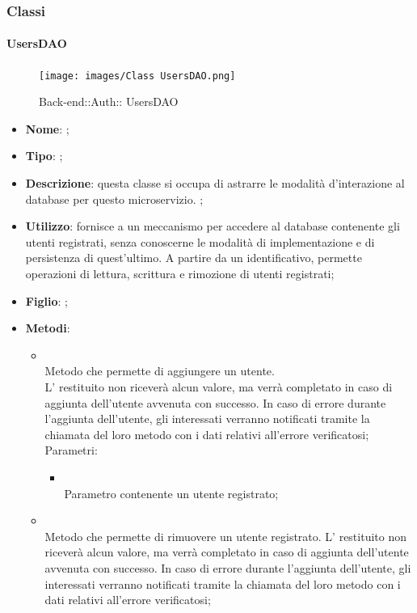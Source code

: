 \subsubsection{Classi}
\hypertarget{ UsersDAO_label}{\paragraph{ UsersDAO}}
\begin{figure}[h]
	\centering
	\texttt{[image: images/Class UsersDAO.png]}
	\caption{Back-end::Auth:: UsersDAO}
\end{figure}
\begin{itemize}
	\item \textbf{Nome}: ;
	\item \textbf{Tipo}: ;
	\item \textbf{Descrizione}: questa classe si occupa di astrarre le modalità d'interazione al database per questo microservizio. ;
	\item \textbf{Utilizzo}: fornisce a  un meccanismo per accedere al database contenente gli utenti registrati, senza conoscerne le modalità di implementazione e di persistenza di quest'ultimo.
A partire da un identificativo, permette operazioni di lettura, scrittura e rimozione di utenti registrati;
	\item \textbf{Figlio}: ;
	\item \textbf{Metodi}:
	\begin{itemize}
		\item[]  \\
		Metodo che permette di aggiungere un utente. \\
L' restituito non riceverà alcun valore, ma verrà completato in caso di aggiunta dell'utente avvenuta con successo. In caso di errore durante l'aggiunta dell'utente, gli  interessati verranno notificati tramite la chiamata del loro metodo  con i dati relativi all'errore verificatosi;\\
		Parametri:
		\begin{itemize}
			\item {} \\
			Parametro contenente un utente registrato;
		\end{itemize}
		\item[]  \\
		Metodo che permette di rimuovere un utente registrato. L' restituito non riceverà alcun valore, ma verrà completato in caso di aggiunta dell'utente avvenuta con successo. In caso di errore durante l'aggiunta dell'utente, gli  interessati verranno notificati tramite la chiamata del loro metodo  con i dati relativi all'errore verificatosi;\\

\end{itemize}
\end{itemize}
